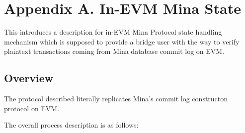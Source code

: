 \chapter{Appendix A. In-EVM Mina State}

This introduces a description for in-EVM Mina Protocol state handling mechanism
which is supposed to provide a bridge user with the way to verify plaintext 
transactions coming from Mina database commit log on EVM.

\section{Overview}

The protocol described literally replicates Mina's commit log constructon
protocol on EVM.

The overall process description is as follows:

